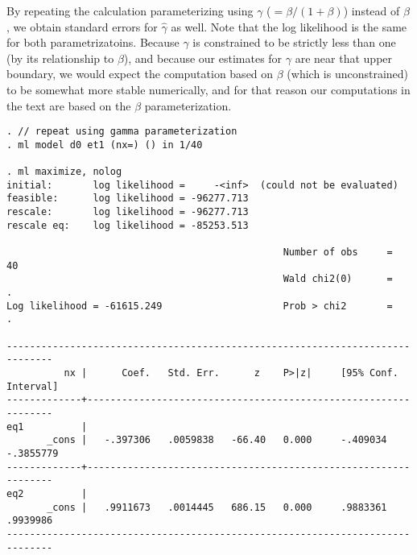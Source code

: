 By repeating the calculation parameterizing using $\gamma$ ($=\beta/(1+\beta)$) instead of $\beta$, we obtain standard errors for $\hat\gamma$ as well.  Note that the log likelihood is the same for both parametrizatoins.  Because $\gamma$ is constrained to be strictly less than one (by its relationship to $\beta$), and because our estimates for $\gamma$ are near that upper boundary, we would expect the computation based on $\beta$ (which is unconstrained) to be somewhat more stable numerically, and for that reason our computations in the text are based on the $\beta$ parameterization.

\begin{verbatim}
. // repeat using gamma parameterization
. ml model d0 et1 (nx=) () in 1/40

. ml maximize, nolog
initial:       log likelihood =     -<inf>  (could not be evaluated)
feasible:      log likelihood = -96277.713
rescale:       log likelihood = -96277.713
rescale eq:    log likelihood = -85253.513

                                                Number of obs     =         40
                                                Wald chi2(0)      =          .
Log likelihood = -61615.249                     Prob > chi2       =          .

------------------------------------------------------------------------------
          nx |      Coef.   Std. Err.      z    P>|z|     [95% Conf. Interval]
-------------+----------------------------------------------------------------
eq1          |
       _cons |   -.397306   .0059838   -66.40   0.000     -.409034   -.3855779
-------------+----------------------------------------------------------------
eq2          |
       _cons |   .9911673   .0014445   686.15   0.000     .9883361    .9939986
------------------------------------------------------------------------------
\end{verbatim}